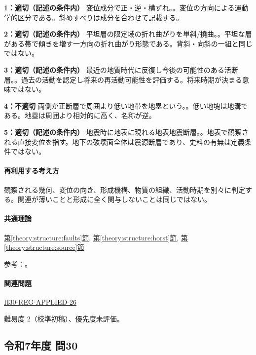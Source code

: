 \noindent\textbf{1：適切（記述の条件内）} 変位成分で正・逆・横ずれ。。変位の方向による運動学的区分である。斜めすべりは成分を合わせて記載する。\par

\noindent\textbf{2：適切（記述の条件内）} 平坦層の限定域の折れ曲がりを単斜/撓曲。。平坦な層がある帯で傾きを増す一方向の折れ曲がり形態である。背斜・向斜の一組と同じではない。\par

\noindent\textbf{3：適切（記述の条件内）} 最近の地質時代に反復し今後の可能性のある活断層。。過去の活動を認定し将来の再活動可能性を評価する。将来時期が決まる意味ではない。\par

\noindent\textbf{4：不適切} 両側が正断層で周囲より低い地帯を地塁という。。低い地塊は地溝である。地塁は周囲より相対的に高く、名称が逆。\par

\noindent\textbf{5：適切（記述の条件内）} 地震時に地表に現れる地表地震断層。。地表で観察される直接変位を指す。地下の破壊面全体は震源断層であり、史料の有無は定義条件ではない。\par

\paragraph{再利用する考え方} 観察される幾何、変位の向き、形成機構、物質の組織、活動時期を別々に判定する。関連が薄いことと形成に全く関与しないことは同じではない。

\paragraph{共通理論} \hyperref[theory:structure:faults]{第\ref*{theory:structure:faults}節}, \hyperref[theory:structure:horst]{第\ref*{theory:structure:horst}節}, \hyperref[theory:structure:source]{第\ref*{theory:structure:source}節}

\par 参考：\cite{str_source}。

\paragraph{関連問題} \hyperref[q:h30-reg-applied-26]{H30-REG-APPLIED-26}

\par 難易度 2（校準初稿）、優先度未評価。

\subsection{令和7年度 問30}
\label{q:r07-reg-applied-30}

